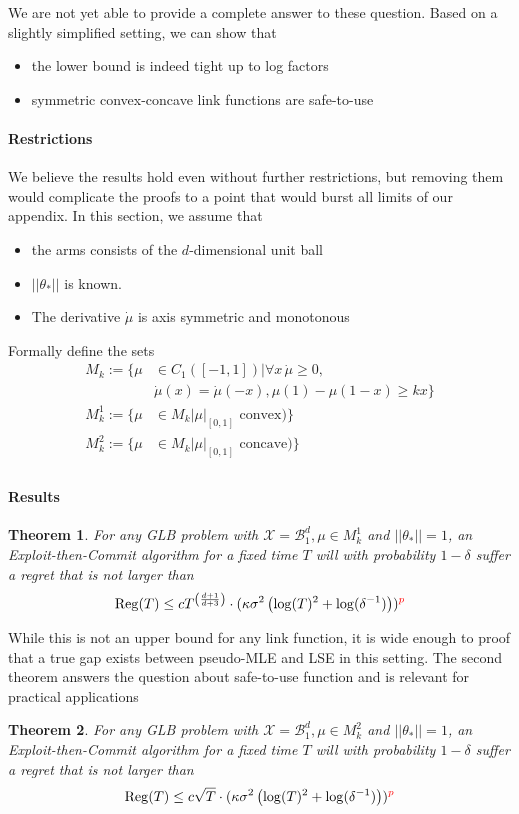 \documentclass[twoside]{article} \usepackage{aistats2017}
\newtheorem{theorem}{Theorem}
\begin{document}
We are not yet able to provide a complete answer to these question. 
Based on a slightly simplified setting, we can show that
\begin{itemize}
\item the lower bound is indeed tight up to log factors
\item symmetric convex-concave link functions are safe-to-use
\end{itemize}

\paragraph{Restrictions}
We believe the results hold even without further restrictions, but removing them would complicate the proofs to a point that would burst all limits of our appendix.
In this section, we assume that
\begin{itemize}
\item the arms consists of the $d$-dimensional unit ball
\item $||\theta_*||$ is known.
\item The derivative $\dot{\mu}$ is axis symmetric and monotonous
\end{itemize}
Formally define the sets
\begin{align*}
M_k := \{\mu &\in C_1([-1,1]) | \forall x \,\dot{\mu}\geq0,\\
&\dot{\mu}(x) = \dot{\mu}(-x), \mu(1)-\mu(1-x)\geq k x\}\\
M_k^1 := \{\mu &\in M_k | \mu|_{[0,1]} \mbox{ convex})\}\\
M_k^2 := \{\mu &\in M_k | \mu|_{[0,1]} \mbox{ concave})\}
\end{align*}
\begin{align*}
\end{align*}
\paragraph{Results} 
\begin{theorem}
For any GLB problem with $\mathcal{X}=\mathcal{B}^{d}_1, \mu\in M_k^1$ and $||\theta_*||=1$, an Exploit-then-Commit algorithm for a fixed time $T$ will with probability $1-\delta$ suffer a regret that is not larger than 
$$
\operatorname{Reg}(T) \leq c T^{\left(\frac{d+1}{d+3}\right)}\cdot(\kappa\sigma^2\left(\log(T)^2+\log(\delta^{-1})\right))\color{red}^p\color{black}
$$
\end{theorem}
While this is not an upper bound for any link function, it is wide enough to proof that a true gap exists between pseudo-MLE and LSE in this setting. The second theorem answers the question about safe-to-use function and is relevant for practical applications
\begin{theorem}
For any GLB problem with $\mathcal{X}=\mathcal{B}^{d}_1, \mu\in M_k^2$ and $||\theta_*||=1$, an Exploit-then-Commit algorithm for a fixed time $T$ will with probability $1-\delta$ suffer a regret that is not larger than
$$
\operatorname{Reg}(T) \leq c \sqrt{T}\cdot(\kappa\sigma^2\left(\log(T)^2+\log(\delta^{-1})\right))\color{red}^p\color{black}
$$
\end{theorem}
\end{document}

